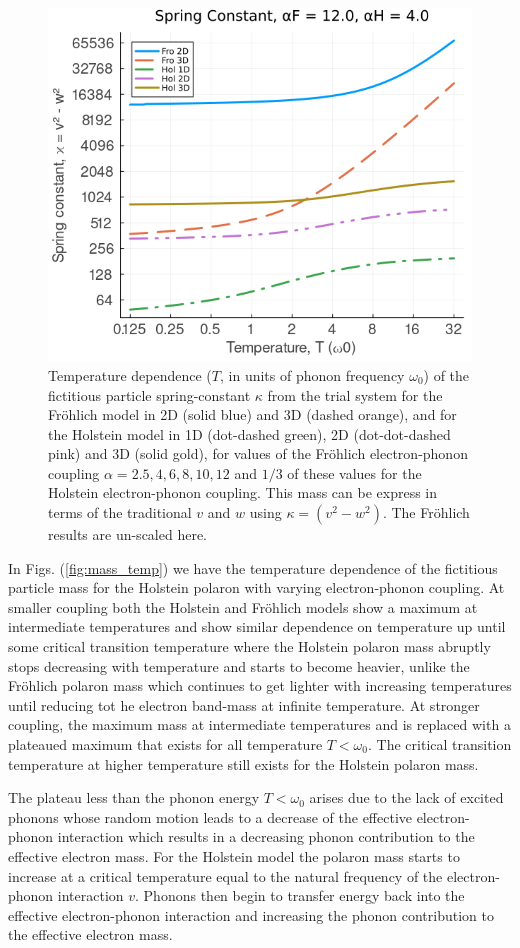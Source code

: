 \begin{figure}[!tbp]
    \includegraphics[width=.49\textwidth]{figures/spring_temp_12_4.png}
    \caption{Temperature dependence ($T$, in units of phonon frequency $\omega_0$) of the fictitious particle spring-constant $\kappa$ from the trial system for the Fr\"ohlich model in 2D (solid blue) and 3D (dashed orange), and for the Holstein model in 1D (dot-dashed green), 2D (dot-dot-dashed pink) and 3D (solid gold), for values of the Fr\"ohlich electron-phonon coupling $\alpha = 2.5, 4, 6, 8, 10, 12$ and $1/3$ of these values for the Holstein electron-phonon coupling. This mass can be express in terms of the traditional $v$ and $w$ using $\kappa = (v^2 - w^2)$. The Fr\"ohlich results are un-scaled here.}
    \label{fig:spring_temp}
\end{figure}

In Figs. (\ref{fig:mass_temp}) we have the temperature dependence of the fictitious particle mass for the Holstein polaron with varying electron-phonon coupling. At smaller coupling both the Holstein and Fr\"ohlich models show a maximum at intermediate temperatures and show similar dependence on temperature up until some critical transition temperature where the Holstein polaron mass abruptly stops decreasing with temperature and starts to become heavier, unlike the Fr\"ohlich polaron mass which continues to get lighter with increasing temperatures until reducing tot he electron band-mass at infinite temperature. At stronger coupling, the maximum mass at intermediate temperatures and is replaced with a plateaued maximum that exists for all temperature $T < \omega_0$. The critical transition temperature at higher temperature still exists for the Holstein polaron mass.
\newline

The plateau less than the phonon energy $T < \omega_0$ arises due to the lack of excited phonons whose random motion leads to a decrease of the effective electron-phonon interaction which results in a decreasing phonon contribution to the effective electron 
mass. For the Holstein model the polaron mass starts to increase at a critical temperature equal to the natural frequency of the electron-phonon interaction $v$. Phonons then begin to transfer energy back into the effective electron-phonon interaction and increasing the phonon contribution to the effective electron mass.
\newline

